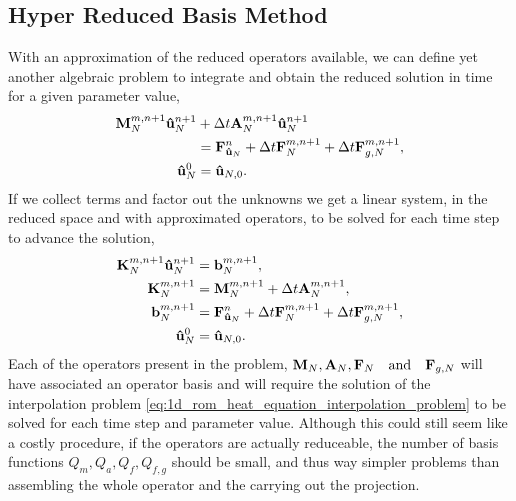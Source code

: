\documentclass[../../1_heat_equation.tex]{subfiles}
\begin{document}
\subsection{Hyper Reduced Basis Method}
With an approximation of the reduced operators available, we can define yet another algebraic problem to integrate and obtain the reduced solution in time for a given parameter value,
\begin{subequations}
    \label{eq:1d_rom_weak_formulation_discrete}
    \begin{align}
        \vb{M}^{m, n+1}_N \vb{\hat{u}}_{N}^{n+1} &+ \Delta t \vb{A}^{m, n+1}_N \vb{\hat{u}}_{N}^{n+1} \\ 
        &= \vb{F}^{n}_{\vb{\hat{u}}_N} + \Delta t \vb{F}_N^{m,n+1} + \Delta t \vb{F}^{m,n+1}_{g, N}, \nonumber \\
        \vb{\hat{u}}_N^{0} &= \vb{\hat{u}}_{N,0}.
    \end{align}
\end{subequations}
If we collect terms and factor out the unknowns we get a linear system, in the reduced space and with approximated operators, to be solved for each time step to advance the solution,
\begin{subequations}
    \label{eq:1d_rom_linear_system_approximation_timestep}
    \begin{align}
        \vb{K}_N^{m,n+1} \vb{\hat{u}}_N^{n+1} &= \vb{b}_N^{m, n+1}, \\
        \vb{K}_N^{m,n+1} &= \vb{M}_{N}^{m,n+1} + \Delta t \vb{A}_{N}^{m,n+1}, \\
        \vb{b}_N^{m,n+1} &= \vb{F}_{\vb{\hat{u}}_N}^{n} + \Delta t \vb{F}_N^{m,n+1} + \Delta t \vb{F}_{g,N}^{m,n+1}, \\
        \vb{\hat{u}}_N^{0} &= \vb{\hat{u}}_{N,0}.
    \end{align}
\end{subequations}
Each of the operators present in the problem, $\vb{M}_N, \vb{A}_N, \vb{F}_N \qqtext{and} \vb{F}_{g,N}$ will have associated an operator basis and will require the solution of the interpolation problem \eqref{eq:1d_rom_heat_equation_interpolation_problem} to be solved for each time step and parameter value.
Although this could still seem like a costly procedure, if the operators are actually reduceable, the number of basis functions $Q_m, Q_a, Q_f, Q_{f,g}$ should be small, and thus way simpler problems than assembling the whole operator and the carrying out the projection. 

\end{document}
